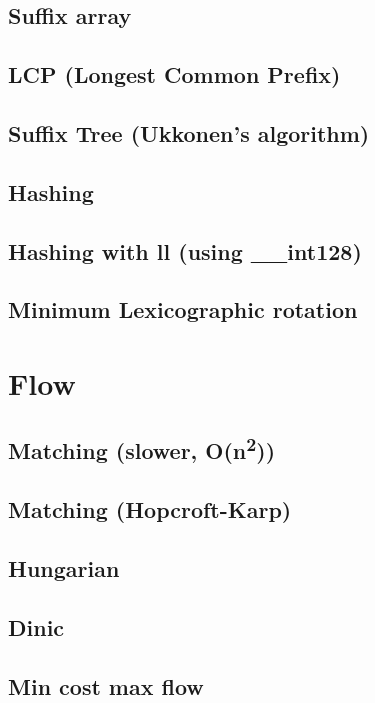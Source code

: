 \subsection{Suffix array}
\subsection{LCP (Longest Common Prefix)}
\subsection{Suffix Tree (Ukkonen's algorithm)}
\subsection{Hashing}
\subsection{Hashing with ll (using \_\_int128)}
\subsection{Minimum Lexicographic rotation}

\section{Flow}
\subsection{Matching (slower, O(n\textsuperscript{2}))}
\subsection{Matching (Hopcroft-Karp)}
\subsection{Hungarian}
\subsection{Dinic}
\subsection{Min cost max flow}
